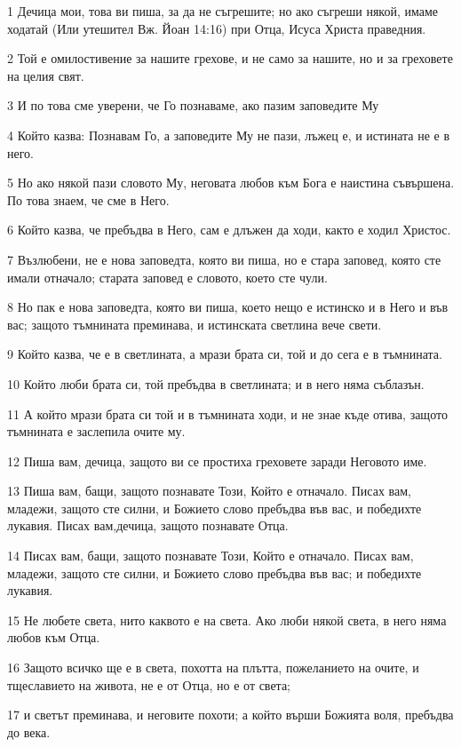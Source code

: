 \par 1 Дечица мои, това ви пиша, за да не съгрешите; но ако съгреши някой, имаме ходатай (Или утешител Вж. Йоан 14:16) при Отца, Исуса Христа праведния.
\par 2 Той е омилостивение за нашите грехове, и не само за нашите, но и за греховете на целия свят.
\par 3 И по това сме уверени, че Го познаваме, ако пазим заповедите Му
\par 4 Който казва: Познавам Го, а заповедите Му не пази, лъжец е, и истината не е в него.
\par 5 Но ако някой пази словото Му, неговата любов към Бога е наистина съвършена. По това знаем, че сме в Него.
\par 6 Който казва, че пребъдва в Него, сам е длъжен да ходи, както е ходил Христос.
\par 7 Възлюбени, не е нова заповедта, която ви пиша, но е стара заповед, която сте имали отначало; старата заповед е словото, което сте чули.
\par 8 Но пак е нова заповедта, която ви пиша, което нещо е истинско и в Него и във вас; защото тъмнината преминава, и истинската светлина вече свети.
\par 9 Който казва, че е в светлината, а мрази брата си, той и до сега е в тъмнината.
\par 10 Който люби брата си, той пребъдва в светлината; и в него няма съблазън.
\par 11 А който мрази брата си той и в тъмнината ходи, и не знае къде отива, защото тъмнината е заслепила очите му.
\par 12 Пиша вам, дечица, защото ви се простиха греховете заради Неговото име.
\par 13 Пиша вам, бащи, защото познавате Този, Който е отначало. Писах вам, младежи, защото сте силни, и Божието слово пребъдва във вас, и победихте лукавия. Писах вам,дечица, защото познавате Отца.
\par 14 Писах вам, бащи, защото познавате Този, Който е отначало. Писах вам, младежи, защото сте силни, и Божието слово пребъдва във вас; и победихте лукавия.
\par 15 Не любете света, нито каквото е на света. Ако люби някой света, в него няма любов към Отца.
\par 16 Защото всичко ще е в света, похотта на плътта, пожеланието на очите, и тщеславието на живота, не е от Отца, но е от света;
\par 17 и светът преминава, и неговите похоти; а който върши Божията воля, пребъдва до века.
